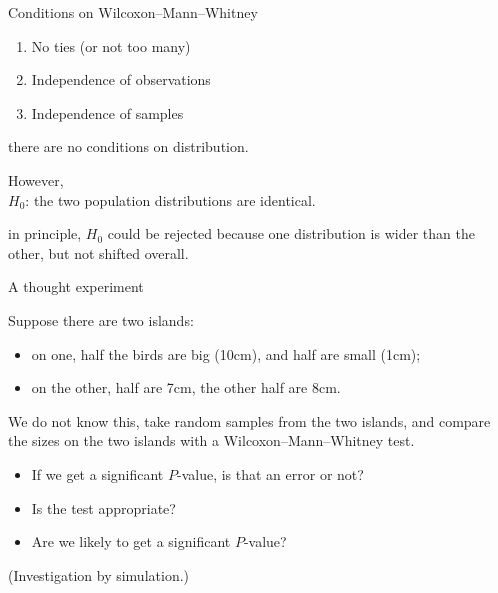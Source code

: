 \begin{frame}{Conditions on Wilcoxon--Mann--Whitney}

  \begin{enumerate}
    \item No ties (or not too many)
    \item Independence of observations
    \item Independence of samples
  \end{enumerate}

    \vspace{2em}

     there are no conditions on distribution.

    \vspace{2em}
   \alert{However,}\\
    $H_0$: the two population distributions are identical.


    \vspace{2em}

     in principle, $H_0$ could be rejected because one distribution is wider than the other, but not shifted overall.

\end{frame}


\begin{frame}{A thought experiment}

  Suppose there are two islands: 
  \begin{itemize}
    \item on one, half the birds are big (10cm), and half are small (1cm);
    \item on the other, half are 7cm, the other half are 8cm.
  \end{itemize}

  \vspace{2em}

  We do not know this, take random samples from the two islands,
  and compare the sizes on the two islands with a Wilcoxon--Mann--Whitney test.
  \begin{itemize}
    \item If we get a significant $P$-value, is that an error or not?
    \item Is the test appropriate?
    \item Are we likely to get a significant $P$-value?
  \end{itemize}

  \vspace{2em}
  \pause

  (Investigation by simulation.)

\end{frame}


